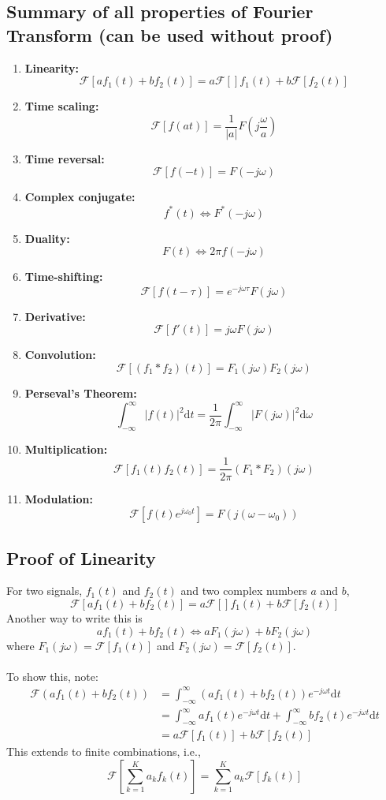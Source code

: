 \documentclass[10pt]{article}
\begin{document}
\subsection*{Summary of all properties of Fourier Transform (can be used without proof)}
\begin{enumerate}
    \item \textbf{Linearity:}
    \[\boxed{\mathcal{F}[a f_1(t) + b f_2(t)] = a \mathcal{F}[]f_1(t) + b\mathcal{F}[f_2(t)]}\]
    \item \textbf{Time scaling:}
    \[\boxed{\mathcal{F}[f(at)] = \frac{1}{|a|}F\left(j\frac{\omega}{a}\right)}\]
    \item \textbf{Time reversal:}
    \[\boxed{\mathcal{F}[f(-t)] = F(-j\omega)}\]
    \item \textbf{Complex conjugate:}
    \[\boxed{f^*(t) \Longleftrightarrow F^*(-j\omega)}\]
    \item \textbf{Duality:}
    \[\boxed{F(t) \Longleftrightarrow 2\pi f(-j\omega)}\]
    \item \textbf{Time-shifting:}
    \[\boxed{\mathcal{F}[f(t - \tau)] = e^{-j\omega \tau} F(j\omega)}\]
    \item \textbf{Derivative:}
    \[\boxed{\mathcal{F}[f'(t)] = j\omega F(j\omega)} \]
    \item \textbf{Convolution:}
    \[\boxed{\mathcal{F}[(f_1 * f_2)(t)] = F_1(j\omega) F_2(j\omega)}\]
    \item \textbf{Perseval's Theorem:}
    \[\boxed{\int_{-\infty}^\infty |f(t)|^2 \text{d}t = \frac{1}{2\pi} \int_{-\infty}^\infty |F(j\omega)|^2 \text{d}\omega}\]
    \item \textbf{Multiplication:}
    \[\boxed{\mathcal{F}[f_1(t)f_2(t)] = \frac{1}{2\pi} (F_1 * F_2)(j\omega)}\]
    \item \textbf{Modulation:}
    \[\boxed{\mathcal{F}[f(t) e^{j\omega_0 t}] = F(j(\omega - \omega_0))}\]
\end{enumerate}

\subsection*{Proof of Linearity}
For two signals, $f_1(t)$ and $f_2(t)$ and two complex numbers $a$ and $b$,
\[\boxed{\mathcal{F}[a f_1(t) + b f_2(t)] = a \mathcal{F}[]f_1(t) + b\mathcal{F}[f_2(t)]}\]
Another way to write this is
\[a f_1(t) + b f_2(t) \Longleftrightarrow aF_1(j\omega) + bF_2(j\omega)\]
where $F_1(j\omega) = \mathcal{F}[f_1(t)]$ and $F_2(j\omega) = \mathcal{F}[f_2(t)]$.\\\\
To show this, note:
\begin{align*}
    \mathcal{F}(af_1(t) + bf_2(t)) &= \int_{-\infty}^\infty (af_1(t) + bf_2(t))e^{-j\omega t} \text{d}t\\
    &= \int_{-\infty}^\infty af_1(t) e^{-j\omega t} \text{d}t + \int_{-\infty}^\infty bf_2(t) e^{-j\omega t} \text{d}t\\
    &= a\mathcal{F}[f_1(t)] + b\mathcal{F}[f_2(t)]
\end{align*}
This extends to finite combinations, i.e., 
\[\mathcal{F}\left[\sum_{k = 1}^K a_k f_k(t)\right] = \sum_{k = 1}^K a_k \mathcal{F}[f_k(t)]\]
\end{document}

